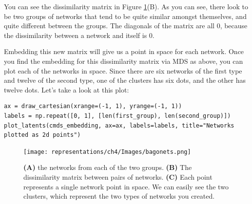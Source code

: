 You can see the dissimilarity matrix in Figure \ref{fig:ch4:bagonets}(B). As you can see, there look to be two groups of networks that tend to be quite similar amongst themselves, and quite different between the groups. The diagonals of the matrix are all 0, because the dissimilarity between a network and itself is 0.

Embedding this {new} matrix will give us a point in space for each network. Once you find the embedding for this dissimilarity matrix via MDS as above, you can plot each of the networks in space. Since there are six networks of the first type and twelve of the second type, one of the clusters has six dots, and the other has twelve dots. Let's take a look at this plot:
\begin{lstlisting}[style=python]
ax = draw_cartesian(xrange=(-1, 1), yrange=(-1, 1))
labels = np.repeat([0, 1], [len(first_group), len(second_group)])
plot_latents(cmds_embedding, ax=ax, labels=labels, title="Networks plotted as 2d points")
\end{lstlisting}

\begin{figure}
    \centering
    \texttt{[image: representations/ch4/Images/bagonets.png]}
    \caption[Bags of networks]{\textbf{(A)} the networks from each of the two groups. \textbf{(B)} The dissimilarity matrix between pairs of networks. \textbf{(C)} Each point represents a single network point in space. We can easily see the two clusters, which represent the two types of networks you created.}
    \label{fig:ch4:bagonets}
\end{figure}

\newpage